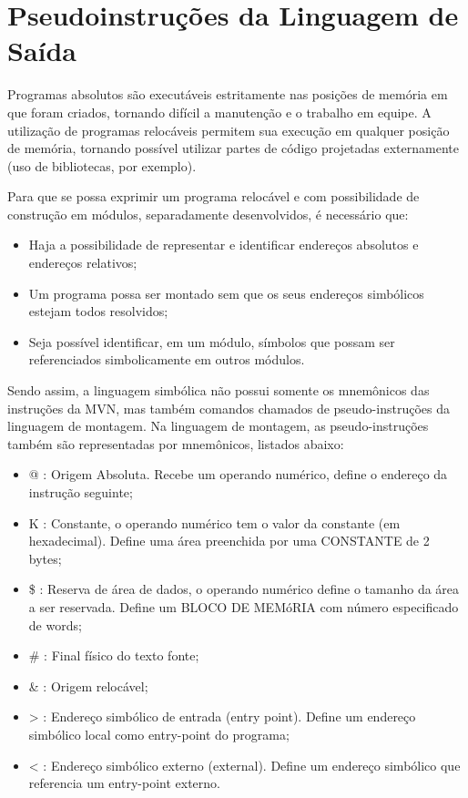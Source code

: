 \section{Pseudoinstruções da Linguagem de Saída}

Programas absolutos são executáveis estritamente nas posições de memória em que foram criados, tornando difícil a manutenção e o trabalho em equipe. A utilização de programas relocáveis permitem sua execução em qualquer posição de memória, tornando possível utilizar partes de código projetadas externamente (uso de bibliotecas, por exemplo).

Para que se possa exprimir um programa relocável e com possibilidade de construção em módulos, separadamente desenvolvidos, é necessário que:
\begin{itemize}
	\item Haja a possibilidade de representar e identificar endereços absolutos e endereços relativos;
	\item Um programa possa ser montado sem que os seus endereços simbólicos estejam todos resolvidos;
	\item Seja possível identificar, em um módulo, símbolos que possam ser referenciados simbolicamente em outros módulos.
\end{itemize}

Sendo assim, a linguagem simbólica não possui somente os mnemônicos das instruções da MVN, mas também comandos chamados de pseudo-instruções da linguagem de montagem. Na linguagem de montagem, as pseudo-instruções também são representadas por mnemônicos, listados abaixo:

\begin{itemize}
	\item @ : Origem Absoluta. Recebe um operando numérico, define o endereço da instrução seguinte;
	\item K : Constante, o operando numérico tem o valor da constante (em hexadecimal). Define uma área preenchida por uma CONSTANTE de 2 bytes;
	\item \$ : Reserva de área de dados, o operando numérico define o tamanho da área a ser reservada. Define um BLOCO DE MEMóRIA com número especificado de words;
	\item \# : Final físico do texto fonte;
	\item \& : Origem relocável;
	\item > : Endereço simbólico de entrada (entry point). Define um endereço simbólico local como entry-point do programa;
	\item < : Endereço simbólico externo (external). Define um endereço simbólico que referencia um entry-point externo.
\end{itemize}

